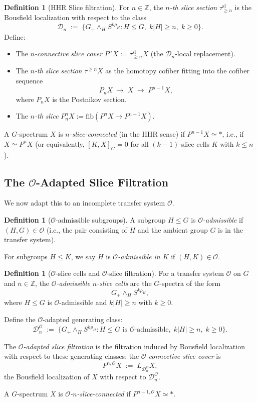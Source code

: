 \documentclass[12pt]{article}
\theoremstyle{definition}
\newtheorem{definition}[theorem]{Definition}
\newcommand{\cO}{\mathcal{O}}
\begin{document}
\begin{definition}[HHR Slice filtration]
\label{def:hhr-slice}
For $n \in \mathbb{Z}$, the \emph{$n$-th slice section} $\tau_{\geq n}^{\mathrm{sl}}$ is the
Bousfield localization with respect to the class
\[
  \mathcal{D}_n \;:=\; \bigl\{G_+ \wedge_H S^{k\rho_H} : H \leq G,\; k|H| \geq n,\; k \geq 0\bigr\}.
\]
Define:
\begin{itemize}
  \item The \emph{$n$-connective slice cover} $P^n X := \tau_{\geq n}^{\mathrm{sl}} X$ (the
    $\mathcal{D}_n$-local replacement).
  \item The \emph{$n$-th slice section} $\tau^{\geq n} X$ as the homotopy cofiber fitting into the
    cofiber sequence
    \[
      P_n X \;\to\; X \;\to\; P^{n-1} X,
    \]
    where $P_n X$ is the Postnikov section.
  \item The \emph{$n$-th slice} $P_n^n X := \mathrm{fib}(P^n X \to P^{n-1} X)$.
\end{itemize}
A $G$-spectrum $X$ is \emph{$n$-slice-connected} (in the HHR sense) if $P^{n-1} X \simeq *$, i.e.,
if $X \simeq P^n X$ (or equivalently, $[K, X]_G = 0$ for all $(k-1)$-slice cells $K$ with
$k \leq n$).
\end{definition}

\subsection{The $\cO$-Adapted Slice Filtration}

We now adapt this to an incomplete transfer system $\cO$.

\begin{definition}[$\cO$-admissible subgroups]
\label{def:admissible}
A subgroup $H \leq G$ is \emph{$\cO$-admissible} if $(H, G) \in \cO$ (i.e., the pair consisting
of $H$ and the ambient group $G$ is in the transfer system).

For subgroups $H \leq K$, we say $H$ is \emph{$\cO$-admissible in $K$} if $(H, K) \in \cO$.
\end{definition}

\begin{definition}[$\cO$-slice cells and $\cO$-slice filtration]
\label{def:O-slice}
For a transfer system $\cO$ on $G$ and $n \in \mathbb{Z}$, the \emph{$\cO$-admissible $n$-slice
cells} are the $G$-spectra of the form
\[
  G_+ \wedge_H S^{k\rho_H},
\]
where $H \leq G$ is $\cO$-admissible and $k|H| \geq n$ with $k \geq 0$.

Define the $\cO$-adapted generating class:
\[
  \mathcal{D}_n^{\cO} \;:=\; \bigl\{G_+ \wedge_H S^{k\rho_H} : H \leq G \text{ is $\cO$-admissible},\;
    k|H| \geq n,\; k \geq 0\bigr\}.
\]

The \emph{$\cO$-adapted slice filtration} is the filtration induced by Bousfield localization with
respect to these generating classes: the \emph{$\cO$-connective slice cover} is
\[
  P^{n,\cO} X \;:=\; L_{\mathcal{D}_n^{\cO}} X,
\]
the Bousfield localization of $X$ with respect to $\mathcal{D}_n^{\cO}$.

A $G$-spectrum $X$ is \emph{$\cO$-$n$-slice-connected} if $P^{n-1,\cO} X \simeq *$.
\end{definition}
\end{document}

